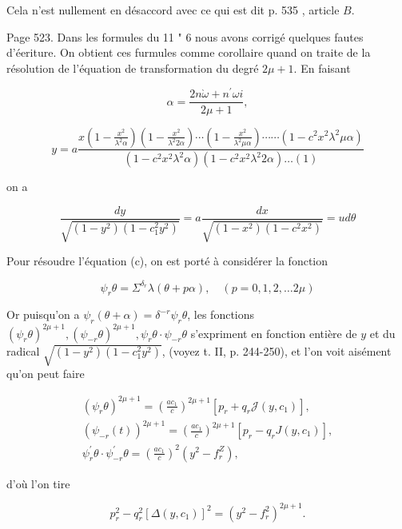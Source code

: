 \documentclass{article}
\begin{document}
Cela n'est nullement en désaccord avec ce qui est dit p. 535 , article \(B\).

Page 523. Dans les formules du 11 " 6 nous avons corrigé quelques fautes d'éeriture. On obtient ces furmules comme corollaire quand on traite de la résolution de l'équation de transformation du degré \(2 \mu+1\). En faisant

\[
\alpha=\frac{2 n \grave{\omega}+n^{\prime} \omega i}{2 \mu+1},
\]

\[
y=a \frac{x\left(1-\frac{x^{2}}{\lambda^{2} \alpha}\right)\left(1-\frac{x^{2}}{\lambda^{2} 2 \alpha}\right) \cdots\left(1-\frac{x^{2}}{\lambda^{2} \mu \alpha}\right) \cdots \cdots\left(1-c^{2} x^{2} \lambda^{2} \mu \alpha\right)}{\left(1-c^{2} x^{2} \lambda^{2} \alpha\right)\left(1-c^{2} x^{2} \lambda^{2} 2 \alpha\right) \ldots(1)}
\]

on a

\[
\frac{d y}{\sqrt{\left(1-y^{2}\right)\left(1-c_{1}^{2} y^{2}\right)}}=a \frac{d x}{\sqrt{\left(1-x^{2}\right)\left(1-c^{2} x^{2}\right)}}=u d \theta
\]

Pour résoudre l'équation (c), on est porté à considérer la fonction

\[
\psi_{r} \theta=\Sigma^{\delta_{r}} \lambda(\theta+p \alpha), \quad(p=0,1,2, \ldots 2 \mu)
\]

Or puisqu'on a \(\psi_{r}(\theta+\alpha)=\delta^{-r} \psi_{r} \theta\), les fonctions \(\left(\psi_{r} \theta\right)^{2 \mu+1},\left(\psi_{-r} \theta\right)^{2 \mu+1}, \psi_{r} \theta \cdot \psi_{-r} \theta\) s'expriment en fonction entière de \(y\) et du radical \(\sqrt{\left(1-y^{2}\right)\left(1-c_{1}^{2} y^{2}\right)}\), (voyez t. II, p. 244-250), et l'on voit aisément qu'on peut faire

\[
\begin{gathered}
\left(\psi_{r} \theta\right)^{2 \mu+1}=\left(\frac{a c_{1}}{c}\right)^{2 \mu+1}\left[p_{r}+q_{r} \mathcal{J}\left(y, c_{1}\right)\right], \\
\left(\psi_{-r}(t)\right)^{2 \mu+1}=\left(\frac{a c_{1}}{c}\right)^{2 \mu+1}\left[p_{r}-q_{r} J\left(y, c_{1}\right)\right], \\
\psi_{r}^{\prime} \theta \cdot \psi_{-r}^{\prime} \theta=\left(\frac{a c_{1}}{c}\right)^{2}\left(y^{2}-f_{r}^{Z}\right),
\end{gathered}
\]

d'où l'on tire

\[
p_{r}^{2}-q_{r}^{2}\left[\Delta\left(y, c_{1}\right)\right]^{2}=\left(y^{2}-f_{r}^{2}\right)^{2 \mu+1} .
\]
\end{document}

